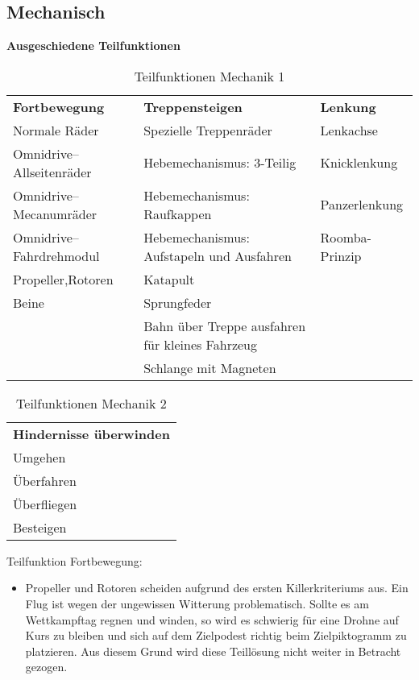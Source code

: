 \subsection{Mechanisch}

\textbf{Ausgeschiedene Teilfunktionen}

\begin{center}
\begin{table}[h!]
    \begin{tabular}{l|l|l}
        \textbf{Fortbewegung} & \textbf{Treppensteigen} & \textbf{Lenkung} \\
        Normale Räder & Spezielle Treppenräder & Lenkachse \\
        Omnidrive–Allseitenräder & Hebemechanismus: 3-Teilig & Knicklenkung \\ 
        Omnidrive–Mecanumräder & Hebemechanismus: Raufkappen & Panzerlenkung \\
        Omnidrive–Fahrdrehmodul & Hebemechanismus: Aufstapeln und Ausfahren & Roomba-Prinzip \\
        \cellcolor{red}Propeller,Rotoren & \cellcolor{red}Katapult & \\
        Beine & Sprungfeder & \\
         & \cellcolor{red}Bahn über Treppe ausfahren für kleines Fahrzeug & \\ 
         & \cellcolor{red}Schlange mit Magneten & \\
    \end{tabular}
    \caption{Teilfunktionen Mechanik 1}
\end{table}
\end{center}

\begin{center}
\begin{table}[h!]
    \begin{tabular}{l}
        \textbf{Hindernisse überwinden}\\
        Umgehen\\
        \cellcolor{red}Überfahren\\
        \cellcolor{red}Überfliegen\\
        \cellcolor{red}Besteigen\\
    \end{tabular}
    \caption{Teilfunktionen Mechanik 2}
\end{table}
\end{center}

Teilfunktion Fortbewegung:
\begin{itemize}
    \item Propeller und Rotoren scheiden aufgrund des ersten Killerkriteriums aus. Ein Flug ist wegen der ungewissen Witterung problematisch. Sollte es am Wettkampftag regnen und winden, so wird es schwierig für eine Drohne auf Kurs zu bleiben und sich auf dem Zielpodest richtig beim Zielpiktogramm zu platzieren. Aus diesem Grund wird diese Teillösung nicht weiter in Betracht gezogen.
 \end{itemize}

